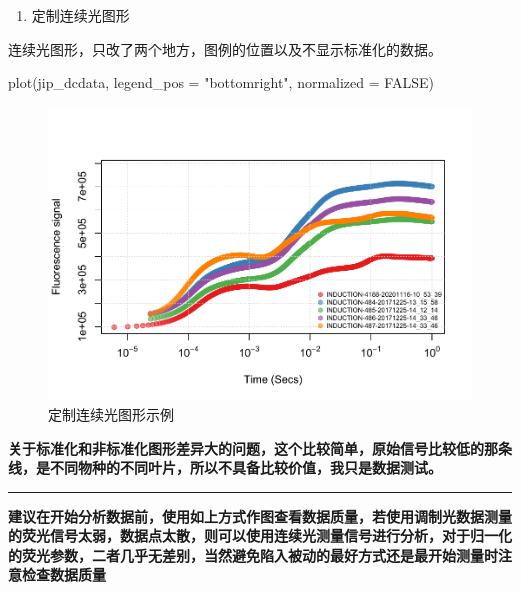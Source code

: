 \documentclass[
]{krantz}
\makeatletter
\newenvironment{Shaded}{\begin{snugshade}}{\end{snugshade}}
\newcommand{\AttributeTok}[1]{\textcolor[rgb]{0.77,0.63,0.00}{#1}}
\newcommand{\ConstantTok}[1]{\textcolor[rgb]{0.00,0.00,0.00}{#1}}
\newcommand{\FunctionTok}[1]{\textcolor[rgb]{0.00,0.00,0.00}{#1}}
\newcommand{\NormalTok}[1]{#1}
\newcommand{\StringTok}[1]{\textcolor[rgb]{0.31,0.60,0.02}{#1}}
\providecommand{\tightlist}{%
  \setlength{\itemsep}{0pt}\setlength{\parskip}{0pt}}
\newenvironment{kframe}{%
\medskip{}
\setlength{\fboxsep}{.8em}
 \def\at@end@of@kframe{}%
 \ifinner\ifhmode%
  \def\at@end@of@kframe{\end{minipage}}%
  \begin{minipage}{\columnwidth}%
 \fi\fi%
 \def\FrameCommand##1{\hskip\@totalleftmargin \hskip-\fboxsep
 \colorbox{shadecolor}{##1}\hskip-\fboxsep
     \hskip-\linewidth \hskip-\@totalleftmargin \hskip\columnwidth}%
 \MakeFramed {\advance\hsize-\width
   \@totalleftmargin\z@ \linewidth\hsize
   \@setminipage}}%
 {\par\unskip\endMakeFramed%
 \at@end@of@kframe}
\renewenvironment{Shaded}{\begin{kframe}}{\end{kframe}}
\makeatother
\begin{document}
\begin{enumerate}
\def\labelenumi{\arabic{enumi}.}
\setcounter{enumi}{1}
\tightlist
\item
  定制连续光图形
\end{enumerate}

连续光图形，只改了两个地方，图例的位置以及不显示标准化的数据。

\begin{Shaded}
\begin{Highlighting}[]
\FunctionTok{plot}\NormalTok{(jip\_dcdata, }\AttributeTok{legend\_pos =} \StringTok{"bottomright"}\NormalTok{, }\AttributeTok{normalized =} \ConstantTok{FALSE}\NormalTok{)}
\end{Highlighting}
\end{Shaded}

\begin{figure}
\centering
\includegraphics{bookdown_files/figure-latex/cus-dc-plot-leg-cls-1.pdf}
\caption{\label{fig:cus-dc-plot-leg-cls}定制连续光图形示例}
\end{figure}

\textbf{关于标准化和非标准化图形差异大的问题，这个比较简单，原始信号比较低的那条线，是不同物种的不同叶片，所以不具备比较价值，我只是数据测试。}

\begin{center}\rule{0.5\linewidth}{0.5pt}\end{center}

\textbf{建议在开始分析数据前，使用如上方式作图查看数据质量，若使用调制光数据测量的荧光信号太弱，数据点太散，则可以使用连续光测量信号进行分析，对于归一化的荧光参数，二者几乎无差别，当然避免陷入被动的最好方式还是最开始测量时注意检查数据质量}
\end{document}
